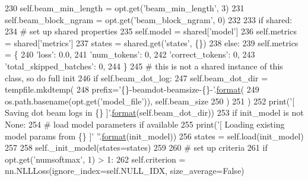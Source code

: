 \begin{DoxyCode}
230         self.beam\_min\_length = opt.get(\textcolor{stringliteral}{'beam\_min\_length'}, 3)
231         self.beam\_block\_ngram = opt.get(\textcolor{stringliteral}{'beam\_block\_ngram'}, 0)
232 
233         \textcolor{keywordflow}{if} shared:
234             \textcolor{comment}{# set up shared properties}
235             self.model = shared[\textcolor{stringliteral}{'model'}]
236             self.metrics = shared[\textcolor{stringliteral}{'metrics'}]
237             states = shared.get(\textcolor{stringliteral}{'states'}, \{\})
238         \textcolor{keywordflow}{else}:
239             self.metrics = \{
240                 \textcolor{stringliteral}{'loss'}: 0.0,
241                 \textcolor{stringliteral}{'num\_tokens'}: 0,
242                 \textcolor{stringliteral}{'correct\_tokens'}: 0,
243                 \textcolor{stringliteral}{'total\_skipped\_batches'}: 0,
244             \}
245             \textcolor{comment}{# this is not a shared instance of this class, so do full init}
246             \textcolor{keywordflow}{if} self.beam\_dot\_log:
247                 self.beam\_dot\_dir = tempfile.mkdtemp(
248                     prefix=\textcolor{stringliteral}{'\{\}-beamdot-beamsize-\{\}-'}.\hyperlink{namespaceparlai_1_1chat__service_1_1services_1_1messenger_1_1shared__utils_a32e2e2022b824fbaf80c747160b52a76}{format}(
249                         os.path.basename(opt.get(\textcolor{stringliteral}{'model\_file'})), self.beam\_size
250                     )
251                 )
252                 print(\textcolor{stringliteral}{'[ Saving dot beam logs in \{\} ]'}.\hyperlink{namespaceparlai_1_1chat__service_1_1services_1_1messenger_1_1shared__utils_a32e2e2022b824fbaf80c747160b52a76}{format}(self.beam\_dot\_dir))
253             \textcolor{keywordflow}{if} init\_model \textcolor{keywordflow}{is} \textcolor{keywordflow}{not} \textcolor{keywordtype}{None}:
254                 \textcolor{comment}{# load model parameters if available}
255                 print(\textcolor{stringliteral}{'[ Loading existing model params from \{\} ]'} \textcolor{stringliteral}{''}.\hyperlink{namespaceparlai_1_1chat__service_1_1services_1_1messenger_1_1shared__utils_a32e2e2022b824fbaf80c747160b52a76}{format}(init\_model))
256                 states = self.load(init\_model)
257 
258             self.\_init\_model(states=states)
259 
260         \textcolor{comment}{# set up criteria}
261         \textcolor{keywordflow}{if} opt.get(\textcolor{stringliteral}{'numsoftmax'}, 1) > 1:
262             self.criterion = nn.NLLLoss(ignore\_index=self.NULL\_IDX, size\_average=\textcolor{keyword}{False})

\end{DoxyCode}
